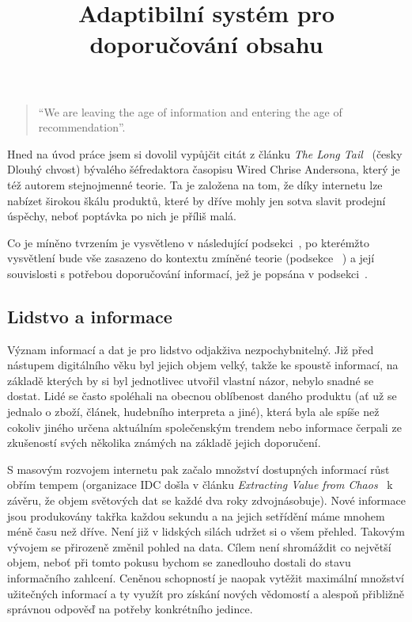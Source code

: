 \documentclass[thesis=M,czech]{FITthesis}[2014/05/07]
\title{Adaptibilní systém pro doporučování obsahu}
\begin{document}

\begin{introduction}
	\begin{quote}
		``We are leaving the age of information and entering the age of recommendation''.
	\end{quote}
	Hned na úvod práce jsem si dovolil vypůjčit citát z článku \emph{The Long Tail}~\cite{anderson} (česky Dlouhý chvost) bývalého šéfredaktora časopisu Wired Chrise Andersona, který je též autorem stejnojmenné teorie. Ta je založena na tom, že díky internetu lze nabízet širokou škálu produktů, které by dříve mohly jen sotva slavit prodejní úspěchy, neboť poptávka po nich je příliš malá. 
	
	Co je míněno tvrzením  je vysvětleno v následující podsekci~, po kterémžto vysvětlení bude vše zasazeno do kontextu zmíněné teorie (podsekce ~) a její souvislosti s potřebou doporučování informací, jež je popsána v podsekci~.
	
	\subsection{Lidstvo a informace}	
	\label{sub:lidinf}
	Význam informací a dat je pro lidstvo odjakživa nezpochybnitelný. Již před nástupem digitálního věku byl jejich objem velký, takže ke spoustě informací, na základě kterých by si byl jednotlivec utvořil vlastní názor, nebylo snadné se dostat. Lidé se často spoléhali na obecnou oblíbenost daného produktu (ať už se jednalo o zboží, článek, hudebního interpreta a jiné), která byla ale spíše než cokoliv jiného určena aktuálním společenským trendem nebo informace čerpali ze zkušeností svých několika známých na základě jejich doporučení.
	
	S masovým rozvojem internetu pak začalo množství dostupných informací růst obřím tempem (organizace IDC došla v článku \emph{Extracting Value from Chaos}~\cite{digitaluniverse} k závěru, že objem světových dat se každé dva roky zdvojnásobuje). Nové informace jsou produkovány takřka každou sekundu a na jejich setřídění máme mnohem méně času než dříve. Není již v lidských silách udržet si o všem přehled. Takovým vývojem se přirozeně změnil pohled na data. Cílem není shromáždit co největší objem, neboť při tomto pokusu bychom se zanedlouho dostali do stavu informačního zahlcení. Ceněnou schopností je naopak vytěžit maximální množství užitečných informací a ty využít pro získání nových vědomostí a alespoň přibližně správnou odpověď na potřeby konkrétního jedince.
	

\end{introduction}
\end{document}
